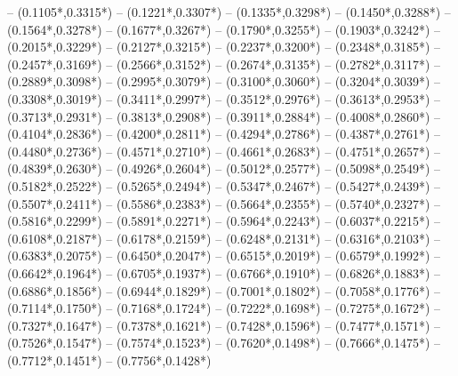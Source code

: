 {	-- ({0.1105*\dx},{0.3315*\dy})
	-- ({0.1221*\dx},{0.3307*\dy})
	-- ({0.1335*\dx},{0.3298*\dy})
	-- ({0.1450*\dx},{0.3288*\dy})
	-- ({0.1564*\dx},{0.3278*\dy})
	-- ({0.1677*\dx},{0.3267*\dy})
	-- ({0.1790*\dx},{0.3255*\dy})
	-- ({0.1903*\dx},{0.3242*\dy})
	-- ({0.2015*\dx},{0.3229*\dy})
	-- ({0.2127*\dx},{0.3215*\dy})
	-- ({0.2237*\dx},{0.3200*\dy})
	-- ({0.2348*\dx},{0.3185*\dy})
	-- ({0.2457*\dx},{0.3169*\dy})
	-- ({0.2566*\dx},{0.3152*\dy})
	-- ({0.2674*\dx},{0.3135*\dy})
	-- ({0.2782*\dx},{0.3117*\dy})
	-- ({0.2889*\dx},{0.3098*\dy})
	-- ({0.2995*\dx},{0.3079*\dy})
	-- ({0.3100*\dx},{0.3060*\dy})
	-- ({0.3204*\dx},{0.3039*\dy})
	-- ({0.3308*\dx},{0.3019*\dy})
	-- ({0.3411*\dx},{0.2997*\dy})
	-- ({0.3512*\dx},{0.2976*\dy})
	-- ({0.3613*\dx},{0.2953*\dy})
	-- ({0.3713*\dx},{0.2931*\dy})
	-- ({0.3813*\dx},{0.2908*\dy})
	-- ({0.3911*\dx},{0.2884*\dy})
	-- ({0.4008*\dx},{0.2860*\dy})
	-- ({0.4104*\dx},{0.2836*\dy})
	-- ({0.4200*\dx},{0.2811*\dy})
	-- ({0.4294*\dx},{0.2786*\dy})
	-- ({0.4387*\dx},{0.2761*\dy})
	-- ({0.4480*\dx},{0.2736*\dy})
	-- ({0.4571*\dx},{0.2710*\dy})
	-- ({0.4661*\dx},{0.2683*\dy})
	-- ({0.4751*\dx},{0.2657*\dy})
	-- ({0.4839*\dx},{0.2630*\dy})
	-- ({0.4926*\dx},{0.2604*\dy})
	-- ({0.5012*\dx},{0.2577*\dy})
	-- ({0.5098*\dx},{0.2549*\dy})
	-- ({0.5182*\dx},{0.2522*\dy})
	-- ({0.5265*\dx},{0.2494*\dy})
	-- ({0.5347*\dx},{0.2467*\dy})
	-- ({0.5427*\dx},{0.2439*\dy})
	-- ({0.5507*\dx},{0.2411*\dy})
	-- ({0.5586*\dx},{0.2383*\dy})
	-- ({0.5664*\dx},{0.2355*\dy})
	-- ({0.5740*\dx},{0.2327*\dy})
	-- ({0.5816*\dx},{0.2299*\dy})
	-- ({0.5891*\dx},{0.2271*\dy})
	-- ({0.5964*\dx},{0.2243*\dy})
	-- ({0.6037*\dx},{0.2215*\dy})
	-- ({0.6108*\dx},{0.2187*\dy})
	-- ({0.6178*\dx},{0.2159*\dy})
	-- ({0.6248*\dx},{0.2131*\dy})
	-- ({0.6316*\dx},{0.2103*\dy})
	-- ({0.6383*\dx},{0.2075*\dy})
	-- ({0.6450*\dx},{0.2047*\dy})
	-- ({0.6515*\dx},{0.2019*\dy})
	-- ({0.6579*\dx},{0.1992*\dy})
	-- ({0.6642*\dx},{0.1964*\dy})
	-- ({0.6705*\dx},{0.1937*\dy})
	-- ({0.6766*\dx},{0.1910*\dy})
	-- ({0.6826*\dx},{0.1883*\dy})
	-- ({0.6886*\dx},{0.1856*\dy})
	-- ({0.6944*\dx},{0.1829*\dy})
	-- ({0.7001*\dx},{0.1802*\dy})
	-- ({0.7058*\dx},{0.1776*\dy})
	-- ({0.7114*\dx},{0.1750*\dy})
	-- ({0.7168*\dx},{0.1724*\dy})
	-- ({0.7222*\dx},{0.1698*\dy})
	-- ({0.7275*\dx},{0.1672*\dy})
	-- ({0.7327*\dx},{0.1647*\dy})
	-- ({0.7378*\dx},{0.1621*\dy})
	-- ({0.7428*\dx},{0.1596*\dy})
	-- ({0.7477*\dx},{0.1571*\dy})
	-- ({0.7526*\dx},{0.1547*\dy})
	-- ({0.7574*\dx},{0.1523*\dy})
	-- ({0.7620*\dx},{0.1498*\dy})
	-- ({0.7666*\dx},{0.1475*\dy})
	-- ({0.7712*\dx},{0.1451*\dy})
	-- ({0.7756*\dx},{0.1428*\dy})
}
